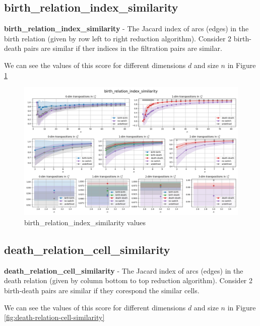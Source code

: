 \documentclass{article}
\begin{document}
\subsection{birth\_relation\_index\_similarity}
\par \textbf{birth\_relation\_index\_similarity} - The Jacard index of arcs (edges) in the birth relation (given by row left to right reduction algorithm).
    Consider 2 birth-death pairs are similar if ther indices in the filtration pairs are similar.
\par We can see the values of this score for different dimensions $d$ and size $n$ in Figure \ref{fig:birth-relation-index-similarity}

\begin{figure}[h!]
    \centering
    \includegraphics[width=1.3\textwidth]{pics/torus-transpositions/similaritites/score=birth-relation-index-similarity.png}
    \caption{birth\_relation\_index\_similarity values}
    \label{fig:birth-relation-index-similarity}
\end{figure}

\subsection{death\_relation\_cell\_similarity}
\par \textbf{death\_relation\_cell\_similarity} - The Jacard index of arcs (edges) in the death relation (given by column bottom to top reduction algorithm).
    Consider 2 birth-death pairs are similar if they corespond the similar cells.
\par We can see the values of this score for different dimensions $d$ and size $n$ in Figure \ref{fig:death-relation-cell-similarity}
\end{document}
